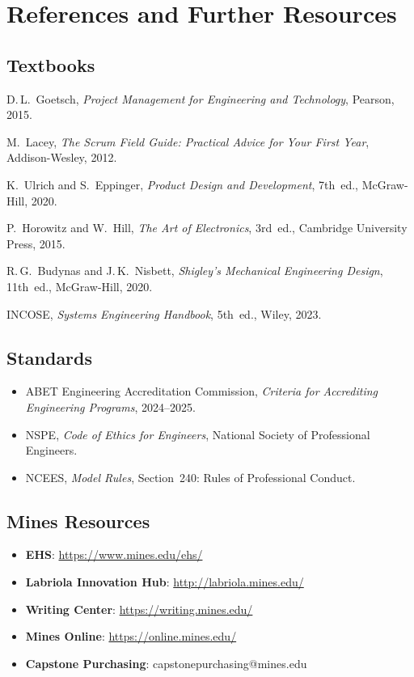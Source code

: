 \chapter*{References and Further Resources}

\section*{Textbooks}
\begin{enumerate}[label={[\arabic*]},leftmargin=2em]
\item D.\,L.~Goetsch, \emph{Project Management for Engineering and Technology}, Pearson, 2015.
\item M.~Lacey, \emph{The Scrum Field Guide: Practical Advice for Your First Year}, Addison-Wesley, 2012.
\item K.~Ulrich and S.~Eppinger, \emph{Product Design and Development}, 7th~ed., McGraw-Hill, 2020.
\item P.~Horowitz and W.~Hill, \emph{The Art of Electronics}, 3rd~ed., Cambridge University Press, 2015.
\item R.\,G.~Budynas and J.\,K.~Nisbett, \emph{Shigley's Mechanical Engineering Design}, 11th~ed., McGraw-Hill, 2020.
\item INCOSE, \emph{Systems Engineering Handbook}, 5th~ed., Wiley, 2023.
\end{enumerate}

\section*{Standards}
\begin{itemize}[leftmargin=1.5em]
\item ABET Engineering Accreditation Commission, \emph{Criteria for Accrediting Engineering Programs}, 2024--2025.
\item NSPE, \emph{Code of Ethics for Engineers}, National Society of Professional Engineers.
\item NCEES, \emph{Model Rules}, Section~240: Rules of Professional Conduct.
\end{itemize}

\section*{Mines Resources}
\begin{itemize}[leftmargin=1.5em]
\item \textbf{EHS}: \url{https://www.mines.edu/ehs/}
\item \textbf{Labriola Innovation Hub}: \url{http://labriola.mines.edu/}
\item \textbf{Writing Center}: \url{https://writing.mines.edu/}
\item \textbf{Mines Online}: \url{https://online.mines.edu/}
\item \textbf{Capstone Purchasing}: capstonepurchasing@mines.edu
\end{itemize}

